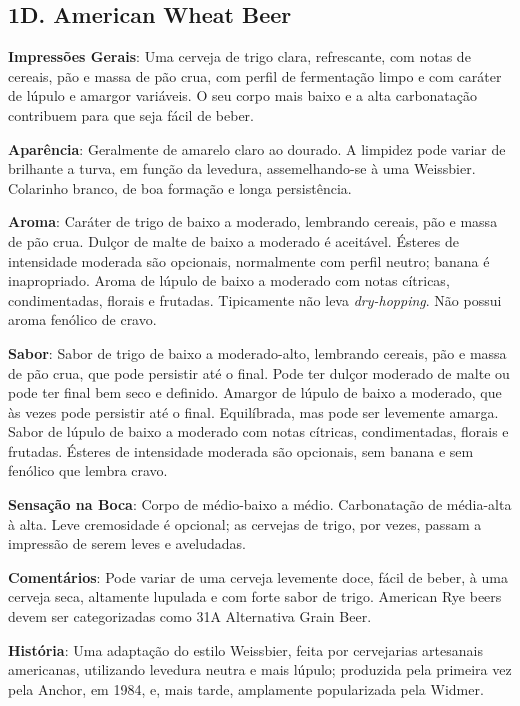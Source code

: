 \subsection*{1D. American Wheat Beer}
\textbf{Impressões Gerais}: Uma cerveja de trigo clara, refrescante, com notas de cereais, pão e massa de pão crua, com perfil de fermentação limpo e com caráter de lúpulo e amargor variáveis. O seu corpo mais baixo e a alta carbonatação contribuem para que seja fácil de beber.

\textbf{Aparência}: Geralmente de amarelo claro ao dourado. A limpidez pode variar de brilhante a turva, em função da levedura, assemelhando-se à uma Weissbier. Colarinho branco, de boa formação e longa persistência.

\textbf{Aroma}: Caráter de trigo de baixo a moderado, lembrando cereais, pão e massa de pão crua. Dulçor de malte de baixo a moderado é aceitável. Ésteres de intensidade moderada são opcionais, normalmente com perfil neutro; banana é inapropriado. Aroma de lúpulo de baixo a moderado com notas cítricas, condimentadas, florais e frutadas. Tipicamente não leva \textit{dry-hopping}. Não possui aroma fenólico de cravo.

\textbf{Sabor}: Sabor de trigo de baixo a moderado-alto, lembrando cereais, pão e massa de pão crua, que pode persistir até o final. Pode ter dulçor moderado de malte ou pode ter final bem seco e definido. Amargor de lúpulo de baixo a moderado, que às vezes pode persistir até o final. Equilíbrada, mas pode ser levemente amarga. Sabor de lúpulo de baixo a moderado com notas cítricas, condimentadas, florais e frutadas. Ésteres de intensidade moderada são opcionais, sem banana e sem fenólico que lembra cravo.

\textbf{Sensação na Boca}: Corpo de médio-baixo a médio. Carbonatação de média-alta à alta. Leve cremosidade é opcional; as cervejas de trigo, por vezes, passam a impressão de serem leves e aveludadas.

\textbf{Comentários}: Pode variar de uma cerveja levemente doce, fácil de beber, à uma cerveja seca, altamente lupulada e com forte sabor de trigo. American Rye beers devem ser categorizadas como 31A Alternativa Grain Beer.

\textbf{História}: Uma adaptação do estilo Weissbier, feita por cervejarias artesanais americanas, utilizando levedura neutra e mais lúpulo; produzida pela primeira vez pela Anchor, em 1984, e, mais tarde, amplamente popularizada pela Widmer.

